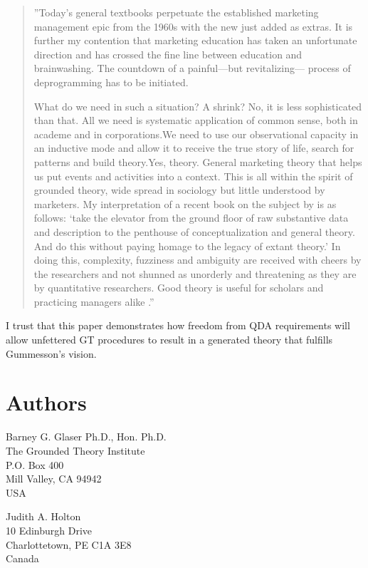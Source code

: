 \begin{quote}
''Today’s general textbooks perpetuate the established marketing
management epic from the 1960s with the new just added as extras. It
is further my contention that marketing education has taken an
unfortunate direction and has crossed the fine line between education
and brainwashing. The countdown of a painful—but revitalizing—
process of deprogramming has to be initiated.

What do we need in such a situation? A shrink? No, it is less
sophisticated than that. All we need is systematic application of
common sense, both in academe and in corporations.We need to use
our observational capacity in an inductive mode and allow it to receive
the true story of life, search for patterns and build theory.Yes, theory.
General marketing theory that helps us put events and activities into a
context. This is all within the spirit of grounded theory, wide spread in
sociology but little understood by marketers. My interpretation of a
recent book on the subject by 
\citep{book.glaser01}
is as follows: ‘take the
elevator from the ground floor of raw substantive data and description to
the penthouse of conceptualization and general theory. And do this
without paying homage to the legacy of extant theory.’ In doing this,
complexity, fuzziness and ambiguity are received with cheers by the
researchers and not shunned as unorderly and threatening as they are
by quantitative researchers. Good theory is useful for scholars and
practicing managers alike \citep[p. 132]{article.gummensson02}.''
\end{quote}

I trust that this paper demonstrates how freedom from QDA requirements will allow unfettered GT procedures to result in a generated theory that fulfills Gummesson’s vision.

\section*{Authors}

\noindent
Barney G. Glaser Ph.D., Hon. Ph.D.\\
The Grounded Theory Institute\\
P.O. Box 400\\
Mill Valley, CA 94942\\
USA

\noindent
Judith A. Holton\\
10 Edinburgh Drive\\
Charlottetown, PE C1A 3E8\\
Canada

